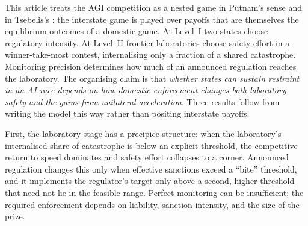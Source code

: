 \documentclass[11pt]{article}
\theoremstyle{plain}
\theoremstyle{definition}
\theoremstyle{remark}
\begin{document}
This article treats the AGI competition as a nested game in Putnam's sense \citep{putnam1988} and in Tsebelis's \citep{tsebelis1990}: the interstate game is played over payoffs that are themselves the equilibrium outcomes of a domestic game. At Level~I two states choose regulatory intensity. At Level~II frontier laboratories choose safety effort in a winner-take-most contest, internalising only a fraction of a shared catastrophe. Monitoring precision determines how much of an announced regulation reaches the laboratory. The organising claim is that \emph{whether states can sustain restraint in an AI race depends on how domestic enforcement changes both laboratory safety and the gains from unilateral acceleration}. Three results follow from writing the model this way rather than positing interstate payoffs.

First, the laboratory stage has a precipice structure: when the laboratory's internalised share of catastrophe is below an explicit threshold, the competitive return to speed dominates and safety effort collapses to a corner. Announced regulation changes this only when effective sanctions exceed a ``bite'' threshold, and it implements the regulator's target only above a second, higher threshold that need not lie in the feasible range. Perfect monitoring can be insufficient; the required enforcement depends on liability, sanction intensity, and the size of the prize.
\end{document}
